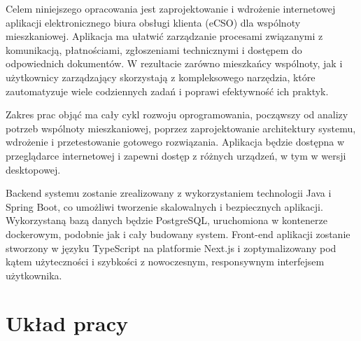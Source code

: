 
Celem niniejszego opracowania jest zaprojektowanie i wdrożenie internetowej aplikacji elektronicznego biura obsługi klienta (eCSO) dla wspólnoty mieszkaniowej. Aplikacja ma ułatwić zarządzanie procesami związanymi z komunikacją, płatnościami, zgłoszeniami technicznymi i dostępem do odpowiednich dokumentów. W rezultacie zarówno mieszkańcy wspólnoty, jak i użytkownicy zarządzający skorzystają z kompleksowego narzędzia, które zautomatyzuje wiele codziennych zadań i poprawi efektywność ich praktyk.

Zakres prac objąć ma cały cykl rozwoju oprogramowania, począwszy od analizy potrzeb wspólnoty mieszkaniowej, poprzez zaprojektowanie architektury systemu, wdrożenie i przetestowanie gotowego rozwiązania. Aplikacja będzie dostępna w przeglądarce internetowej i zapewni dostęp z różnych urządzeń, w tym w wersji desktopowej. 

Backend systemu zostanie zrealizowany z wykorzystaniem technologii Java i Spring Boot, co umożliwi tworzenie skalowalnych i bezpiecznych aplikacji. Wykorzystaną bazą danych będzie PostgreSQL, uruchomiona w kontenerze dockerowym, podobnie jak i cały budowany system. Front-end aplikacji zostanie stworzony w języku TypeScript na platformie Next.js i zoptymalizowany pod kątem użyteczności i szybkości z nowoczesnym, responsywnym interfejsem użytkownika. 

\section{Układ pracy}
